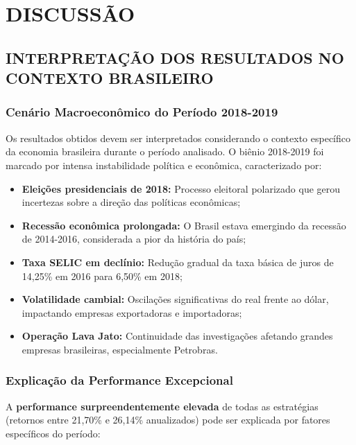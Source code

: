
\chapter{DISCUSSÃO}

\section{INTERPRETAÇÃO DOS RESULTADOS NO CONTEXTO BRASILEIRO}

\subsection{Cenário Macroeconômico do Período 2018-2019}

Os resultados obtidos devem ser interpretados considerando o contexto específico da economia brasileira durante o período analisado. O biênio 2018-2019 foi marcado por intensa instabilidade política e econômica, caracterizado por:

\begin{itemize}
    \item \textbf{Eleições presidenciais de 2018:} Processo eleitoral polarizado que gerou incertezas sobre a direção das políticas econômicas;
    \item \textbf{Recessão econômica prolongada:} O Brasil estava emergindo da recessão de 2014-2016, considerada a pior da história do país;
    \item \textbf{Taxa SELIC em declínio:} Redução gradual da taxa básica de juros de 14,25\% em 2016 para 6,50\% em 2018;
    \item \textbf{Volatilidade cambial:} Oscilações significativas do real frente ao dólar, impactando empresas exportadoras e importadoras;
    \item \textbf{Operação Lava Jato:} Continuidade das investigações afetando grandes empresas brasileiras, especialmente Petrobras.
\end{itemize}

\subsection{Explicação da Performance Excepcional}

A \textbf{performance surpreendentemente elevada} de todas as estratégias (retornos entre 21,70\% e 26,14\% anualizados) pode ser explicada por fatores específicos do período:

